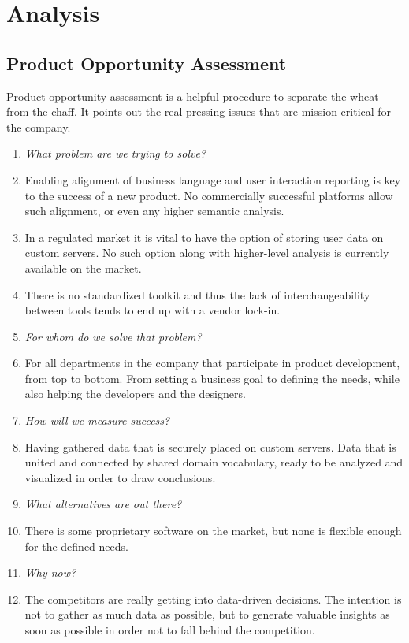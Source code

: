 \chapter{Analysis}

\section{Product Opportunity Assessment}

Product opportunity assessment is a helpful procedure to separate the wheat from the chaff. It points out the real pressing issues that are mission critical for the company.

\begin{enumerate}
	\item \emph{What problem are we trying to solve?}
	\item[] Enabling alignment of business language and user interaction reporting is key to the success of a new product. No commercially successful platforms allow such alignment, or even any higher semantic analysis. 
	\item[] In a regulated market it is vital to have the option of storing user data on custom servers. No such option along with higher-level analysis is currently available on the market.
	\item[] There is no standardized toolkit and thus the lack of interchangeability between tools tends to end up with a vendor lock-in.
	
	\item \emph{For whom do we solve that problem?}
	\item[] 	For all departments in the company that participate in product development, from top to bottom. From setting a business goal to defining the needs, while also helping the developers and the designers.
	
	\item \emph{How will we measure success?}
	\item[] Having gathered data that is securely placed on custom servers. Data that is united and connected by shared domain vocabulary, ready to be analyzed and visualized in order to draw conclusions.

	\item \emph{What alternatives are out there?}
	\item[] There is some proprietary software on the market, but none is flexible enough for the defined needs.

	\item \emph{Why now?}
	\item[] The competitors \cite{data-driven-pharma} are really getting into data-driven decisions. The intention is not to gather as much data as possible, but to generate valuable insights as soon as possible in order not to fall behind the competition.


\end{enumerate}

